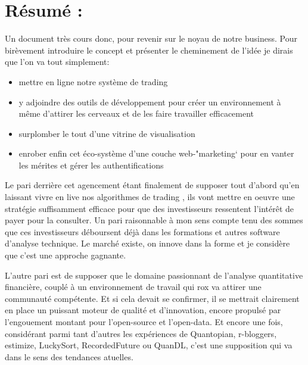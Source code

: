 \section*{Résumé :}


Un document très cours donc, pour revenir sur le noyau de notre business. Pour
birèvement introduire le concept et présenter le cheminement de l'idée je
dirais que l'on va tout simplement: \newline

\begin{itemize}

    \item mettre en ligne notre système de trading
    \item y adjoindre des outils de développement pour créer un environnement
    à même d'attirer les cerveaux et de les faire travailler efficacement
    \item surplomber le tout d'une vitrine de visualisation
    \item enrober enfin cet éco-système d'une couche web-"marketing` pour en
    vanter les mérites et gérer les authentifications\newline

\end{itemize}

Le pari derrière cet agencement étant finalement de supposer tout d'abord qu'en
laissant vivre en live nos algorithmes de trading , ils vont mettre en oeuvre une
stratégie suffisamment efficace pour que des investisseurs ressentent l'intérêt
de payer pour la consulter. Un pari raisonnable à mon sens compte tenu des
sommes que ces investisseurs déboursent déjà dans les formations et autres
software d'analyse technique. Le marché existe, on innove dans la forme et je
considère que c'est une approche gagnante.\newline

L'autre pari est de supposer que le domaine passionnant de l'analyse
quantitative financière, couplé à un environnement de travail qui rox va attirer
une communauté compétente. Et si cela devait se confirmer, il se mettrait
clairement en place un puissant moteur de qualité et d'innovation, encore
propulsé par l'engouement montant pour l'open-source et l'open-data. Et encore une fois, 
considérant parmi tant d'autres les expériences de Quantopian, r-bloggers,
estimize, LuckySort, RecordedFuture ou QuanDL, c'est une supposition qui va
dans le sens des tendances atuelles.\newline


